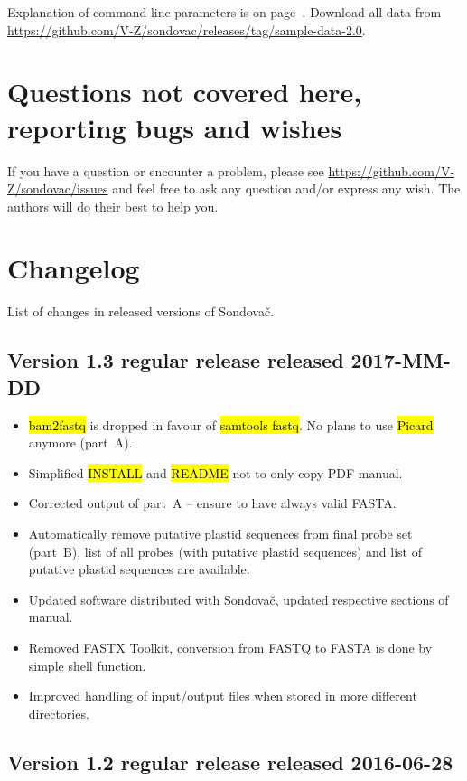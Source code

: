 \documentclass[a4paper, 11pt, twoside]{article}
\renewcommand{\texttt}[1]{\hl{\ttfamily #1}}
\begin{document}
Explanation of command line parameters is on page~\pageref{script-usage}. Download all data from \url{https://github.com/V-Z/sondovac/releases/tag/sample-data-2.0}.

\section{Questions not covered here, reporting bugs and wishes}

If you have a question or encounter a problem, please see \url{https://github.com/V-Z/sondovac/issues} and feel free to ask any question and/or express any wish. The authors will do their best to help you.

\section{Changelog} %

List of changes in released versions of Sondovač.

\subsection{Version 1.3 regular release released 2017-MM-DD}

\begin{itemize}
  \item \texttt{bam2fastq} is dropped in favour of \texttt{samtools fastq}. No plans to use \texttt{Picard} anymore (part~A).
  \item Simplified \texttt{INSTALL} and \texttt{README} not to only copy PDF manual.
  \item Corrected output of part~A -- ensure to have always valid FASTA.
  \item Automatically remove putative plastid sequences from final probe set (part~B), list of all probes (with putative plastid sequences) and list of putative plastid sequences are available.
  \item Updated software distributed with Sondovač, updated respective sections of manual.
  \item Removed FASTX Toolkit, conversion from FASTQ to FASTA is done by simple shell function.
  \item Improved handling of input/output files when stored in more different directories.
\end{itemize}

\subsection{Version 1.2 regular release released 2016-06-28}
\end{document}
